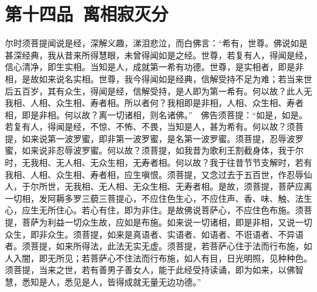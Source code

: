 \documentclass[12pt,twoside,openany]{book}
\begin{document}
\chapter{第十四品\ 离相寂灭分}
\begin{pinyinscope}
尔时须菩提闻说是经，深解义趣，涕泪悲泣，而白佛言：“希有，世尊。佛说如是甚深经典，我从昔来所得慧眼，未曾得闻如是之经。世尊，若复有人，得闻是经，信心清净，即生实相。当知是人，成就第一希有功德。世尊，是实相者，即是非相，是故如来说名实相。世尊，我今得闻如是经典，信解受持不足为难；若当来世后五百岁，其有众生，得闻是经，信解受持，是人即为第一希有。何以故？此人无我相、人相、众生相、寿者相。所以者何？我相即是非相，人相、众生相、寿者相，即是非相。何以故？离一切诸相，则名诸佛。”　佛告须菩提：“如是，如是。若复有人，得闻是经，不惊、不怖、不畏，当知是人，甚为希有。何以故？须菩提，如来说第一波罗蜜，即非第一波罗蜜，是名第一波罗蜜。须菩提，忍辱波罗蜜，如来说非忍辱波罗蜜。何以故？须菩提，如我昔为歌利王割截身体，我于尔时，无我相、无人相、无众生相，无寿者相。何以故？我于往昔节节支解时，若有我相、人相、众生相、寿者相，应生嗔恨。须菩提，又念过去于五百世，作忍辱仙人，于尔所世，无我相、无人相、无众生相、无寿者相。是故，须菩提，菩萨应离一切相，发阿耨多罗三藐三菩提心，不应住色生心，不应住声、香、味、触、法生心，应生无所住心。若心有住，即为非住。是故佛说菩萨心，不应住色布施。须菩提，菩萨为利益一切众生故，应如是布施。如来说一切诸相，即是非相，又说一切众生，即非众生。须菩提，如来是真语者、实语者、如语者、不诳语者、不异语者。须菩提，如来所得法，此法无实无虚。须菩提，若菩萨心住于法而行布施，如人入闇，即无所见；若菩萨心不住法而行布施，如人有目，日光明照，见种种色。须菩提，当来之世，若有善男子善女人，能于此经受持读诵，即为如来，以佛智慧，悉知是人，悉见是人，皆得成就无量无边功德。”
\end{pinyinscope}
\end{document}

